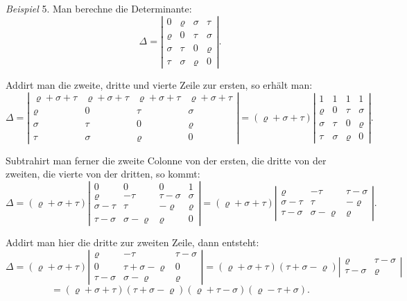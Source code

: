 \documentclass[11pt]{article}
\let\Delta\varDelta
\begin{document}
\textit{Beispiel} 5. Man berechne die Determinante:
\[
\Delta =
\left|
\begin{array}{cccc}
0 & \varrho & \sigma & \tau \\
\varrho & 0 & \tau & \sigma \\
\sigma & \tau & 0 & \varrho \\
\tau & \sigma & \varrho & 0
\end{array}
\right|.
\]

Addirt man die zweite, dritte und vierte Zeile zur ersten, so erhält man:
\[
\Delta =
\left|
\begin{array}{cccc}
\varrho+\sigma+\tau & \varrho+\sigma+\tau & \varrho+\sigma+\tau & \varrho+\sigma+\tau \\
\varrho & 0 & \tau & \sigma \\
\sigma & \tau & 0 & \varrho \\
\tau & \sigma & \varrho & 0
\end{array}
\right|
= (\varrho+\sigma+\tau)
\left|
\begin{array}{cccc}
1 & 1 & 1 & 1 \\
\varrho & 0 & \tau & \sigma \\
\sigma & \tau & 0 & \varrho \\
\tau & \sigma & \varrho & 0
\end{array}
\right|.
\]

Subtrahirt man ferner die zweite Colonne von der ersten, die dritte von der zweiten, die vierte von der dritten, so kommt:
\[
\Delta = (\varrho+\sigma+\tau)
\left|
\begin{array}{cccc}
0 & 0 & 0 & 1 \\
\varrho & -\tau & \tau-\sigma & \sigma \\
\sigma-\tau & \tau & -\varrho & \varrho \\
\tau-\sigma & \sigma-\varrho & \varrho & 0
\end{array}
\right|
= (\varrho+\sigma+\tau)
\left|
\begin{array}{ccc}
\varrho & -\tau & \tau-\sigma \\
\sigma-\tau & \tau & -\varrho \\
\tau-\sigma & \sigma-\varrho & \varrho
\end{array}
\right|.
\]

Addirt man hier die dritte zur zweiten Zeile, dann entsteht:
\[
\Delta = (\varrho+\sigma+\tau)
\left|
\begin{array}{ccc}
\varrho & -\tau & \tau-\sigma \\
0 & \tau+\sigma-\varrho & 0 \\
\tau-\sigma & \sigma-\varrho & \varrho
\end{array}
\right|
= (\varrho+\sigma+\tau)(\tau+\sigma-\varrho)
\left|
\begin{array}{cc}
\varrho & \tau-\sigma \\
\tau-\sigma & \varrho
\end{array}
\right|
\]
\[
= (\varrho+\sigma+\tau)(\tau+\sigma-\varrho)(\varrho+\tau-\sigma)(\varrho-\tau+\sigma).
\]
\end{document}
